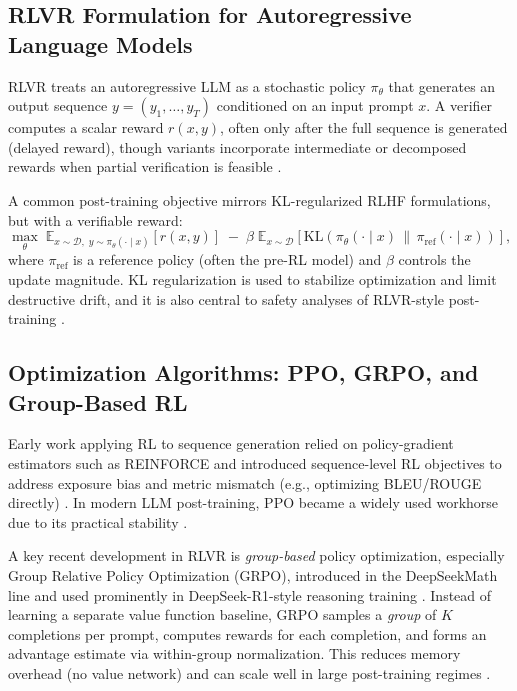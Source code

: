 \documentclass[unnumsec,webpdf,contemporary,large]{oup-authoring-template}
\theoremstyle{thmstyleone}
\theoremstyle{thmstyletwo}
\theoremstyle{thmstylethree}
\begin{document}
\subsection{RLVR Formulation for Autoregressive Language Models}

RLVR treats an autoregressive LLM as a stochastic policy $\pi_\theta$ that generates an output sequence $y = (y_1,\dots,y_T)$ conditioned on an input prompt $x$.
A verifier computes a scalar reward $r(x,y)$, often only after the full sequence is generated (delayed reward), though variants incorporate intermediate or decomposed rewards when partial verification is feasible \cite{wang2026verpo}.

A common post-training objective mirrors KL-regularized RLHF formulations, but with a verifiable reward:
\begin{equation}
\label{eq:rlvr_objective}
\max_{\theta}\;
\mathbb{E}_{x \sim \mathcal{D},\; y \sim \pi_\theta(\cdot \mid x)}
\left[r(x,y)\right]
\;-\;
\beta\;\mathbb{E}_{x \sim \mathcal{D}}
\left[\mathrm{KL}\!\left(\pi_\theta(\cdot\mid x)\,\|\,\pi_{\mathrm{ref}}(\cdot\mid x)\right)\right],
\end{equation}
where $\pi_{\mathrm{ref}}$ is a reference policy (often the pre-RL model) and $\beta$ controls the update magnitude.
KL regularization is used to stabilize optimization and limit destructive drift, and it is also central to safety analyses of RLVR-style post-training \cite{cho2025safetycapability}.

\subsection{Optimization Algorithms: PPO, GRPO, and Group-Based RL}

Early work applying RL to sequence generation relied on policy-gradient estimators such as REINFORCE \cite{williams1992reinforce} and introduced sequence-level RL objectives to address exposure bias and metric mismatch (e.g., optimizing BLEU/ROUGE directly) \cite{ranzato2016sequence,paulus2018summarization}.
In modern LLM post-training, PPO became a widely used workhorse due to its practical stability \cite{schulman2017ppo,ouyang2022instructgpt}.

A key recent development in RLVR is \emph{group-based} policy optimization, especially Group Relative Policy Optimization (GRPO), introduced in the DeepSeekMath line and used prominently in DeepSeek-R1-style reasoning training \cite{deepseekai2024deepseekmath,guo2025deepseekr1}.
Instead of learning a separate value function baseline, GRPO samples a \emph{group} of $K$ completions per prompt, computes rewards for each completion, and forms an advantage estimate via within-group normalization.
This reduces memory overhead (no value network) and can scale well in large post-training regimes \cite{deepseekai2024deepseekmath,mroueh2025grpo}.
\end{document}
